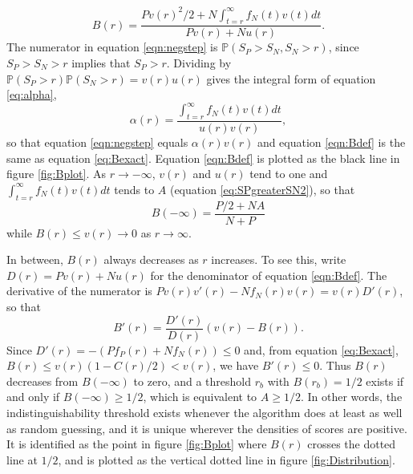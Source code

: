 \documentclass[preprint,12pt]{article}
\newcommand{\prob}{\mathbb{P}}  %
\begin{document}
\begin{equation}
B(r) = \frac{P v(r)^2/2 + N \int_{t=r}^\infty f_N(t) v(t) dt }{P v(r) + N u(r)} .
 \label{eqn:Bdef}
\end{equation}
The numerator in equation \ref{eqn:negstep} is $\prob(S_P > S_N, S_N > r)$, since $S_P>S_N>r$ implies that $S_P>r$. Dividing by $\prob(S_P>r)\prob(S_N>r) = v(r) u(r)$ gives the integral form of equation \ref{eq:alpha},
\begin{equation}
\alpha(r) = \frac{\int_{t=r}^\infty f_N(t) v(t) dt}{u(r) v(r)} ,
\end{equation}
so that equation \ref{eqn:negstep} equals $\alpha(r) v(r)$ and equation \ref{eqn:Bdef} is the same as equation \ref{eq:Bexact}. Equation \ref{eqn:Bdef} is plotted as the black line in figure \ref{fig:Bplot}. As $r \rightarrow -\infty$, $v(r)$ and $u(r)$ tend to one and $\int_{t=r}^\infty f_N(t) v(t) dt$ tends to $A$ (equation \ref{eq:SPgreaterSN2}), so that
\[
B(-\infty) = \frac{P/2 + N A}{N + P} 
\]
while $B(r) \leq v(r) \rightarrow 0$ as $r \rightarrow \infty$. 

In between, $B(r)$ always decreases as $r$ increases. To see this, write $D(r) = P v(r) + N u(r)$ for the denominator of equation \ref{eqn:Bdef}. The derivative of the numerator is $P v(r) v'(r) - N f_N(r) v(r) = v(r) D'(r)$, so that
\[
B'(r) = \frac{D'(r)}{D(r)} \left( v(r) - B(r) \right).
\]
Since $D'(r) = -(P f_P(r) + N f_N(r)) \leq 0$ and, from equation \ref{eq:Bexact}, $B(r) \leq v(r) \left(1 - C(r)/2\right) < v(r)$, we have $B'(r) \leq 0$. Thus $B(r)$ decreases from $B(-\infty)$ to zero, and a threshold $r_b$ with $B(r_b)=1/2$ exists if and only if $B(-\infty) \geq 1/2$, which is equivalent to $A \geq 1/2$. In other words, the indistinguishability threshold exists whenever the algorithm does at least as well as random guessing, and it is unique wherever the densities of scores are positive. It is identified as the point in figure \ref{fig:Bplot} where $B(r)$ crosses the dotted line at $1/2$, and is plotted as the vertical dotted line in figure \ref{fig:Distribution}.


%


\end{document}
